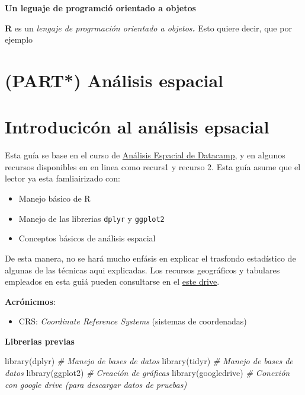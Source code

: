 \documentclass[
]{book}
\newenvironment{Shaded}{\begin{snugshade}}{\end{snugshade}}
\newcommand{\CommentTok}[1]{\textcolor[rgb]{0.56,0.35,0.01}{\textit{#1}}}
\newcommand{\FunctionTok}[1]{\textcolor[rgb]{0.00,0.00,0.00}{#1}}
\newcommand{\NormalTok}[1]{#1}
\providecommand{\tightlist}{%
  \setlength{\itemsep}{0pt}\setlength{\parskip}{0pt}}
\begin{document}
\textbf{Un leguaje de programció orientado a objetos}

\textbf{R} es un \emph{lengaje de progrmación orientado a objetos\textbf{.}} Esto quiere decir, que por ejemplo

\hypertarget{part-anuxe1lisis-espacial}{%
\chapter{(PART*) Análisis espacial}\label{part-anuxe1lisis-espacial}}

\hypertarget{introducicuxf3n-al-anuxe1lisis-epsacial}{%
\chapter{Introducicón al análisis epsacial}\label{introducicuxf3n-al-anuxe1lisis-epsacial}}

Esta guía se base en el curso de \href{https://app.datacamp.com/learn/skill-tracks/spatial-data-with-r?version=1}{Análisis Espacial de Datacamp}, y en algunos recursos disponibles en en linea como recurs1 y recurso 2. Esta guía asume que el lector ya esta famliairizado con:

\begin{itemize}
\item
  Manejo básico de R
\item
  Manejo de las librerias \texttt{dplyr} y \texttt{ggplot2}
\item
  Conceptos básicos de análisis espacial
\end{itemize}

De esta manera, no se hará mucho enfásis en explicar el trasfondo estadístico de algunas de las técnicas aqui explicadas. Los recursos geográficos y tabulares empleados en esta guiá pueden consultarse en el \href{https://drive.google.com/drive/folders/10VeNIEctH2rq7ToQfMKcqeubXemqrKXe?usp=sharing}{este drive}.

\textbf{Acrónicmos}:

\begin{itemize}
\tightlist
\item
  CRS: \emph{Coordinate Reference Systems} (sistemas de coordenadas)
\end{itemize}

\textbf{Librerias previas}

\begin{Shaded}
\begin{Highlighting}[]
\FunctionTok{library}\NormalTok{(dplyr) }\CommentTok{\# Manejo de bases de datos}
\FunctionTok{library}\NormalTok{(tidyr) }\CommentTok{\# Manejo de bases de datos}
\FunctionTok{library}\NormalTok{(ggplot2) }\CommentTok{\# Creación de gráficas}
\FunctionTok{library}\NormalTok{(googledrive) }\CommentTok{\# Conexión con google drive (para descargar datos de pruebas)}
\end{Highlighting}
\end{Shaded}
\end{document}
